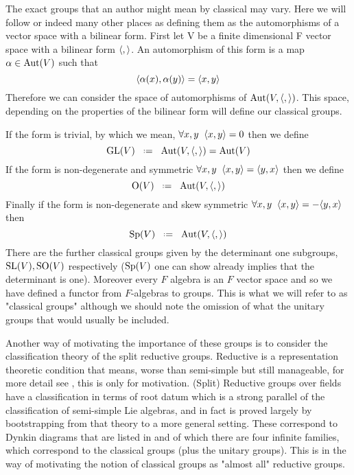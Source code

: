 The exact groups that an author might mean by classical may vary. Here we will follow \cite[\S 13]{CliffordAlgebrasClassical} or indeed many other places as defining them as the automorphisms of a vector space with a bilinear form. First let V be a finite dimensional F vector space with a bilinear form \(\langle ,\rangle\). An automorphism of this form is a map \(\alpha\in \operatorname{Aut}(V)\) such that 
\[\langle \alpha(x), \alpha(y)\rangle = \langle x,y\rangle\]
Therefore we can consider the space of automorphisms of \(\operatorname{Aut}(V, \langle ,\rangle)\). This space, depending on the properties of the bilinear form will define our classical groups. 

If the form is trivial, by which we mean, \(\forall x,y \;\; \langle x, y\rangle = 0\) then we define 
\[\GL(V) \defeq \Aut(V, \inner{,}) = \Aut(V)\]
If the form is non-degenerate and symmetric \(\forall x,y \;\; \langle x, y\rangle = \langle y,x\rangle\) then we define
\[\mathrm{O}(V) \defeq \Aut(V, \inner{,})\]
Finally if the form is non-degenerate and skew symmetric \(\forall x,y \;\; \langle x, y\rangle = -\langle y,x\rangle\) then 
\[\Sp(V) \defeq \Aut(V, \inner{,})\]
There are the further classical groups given by the determinant one subgroups, \(\operatorname{SL}(V), \mathrm{SO}(V)\) respectively (\(\operatorname{Sp}(V)\) one can show already implies that the determinant is one). Moreover every \(F\) algebra is an \(F\) vector space and so we have defined a functor from \(F\)-algebras to groups. This is what we will refer to as "classical groups" although we should note the omission of what the unitary groups that  would usually be included.

Another way of motivating the importance of these groups is to consider the classification theory of the split reductive groups. Reductive is a representation theoretic condition that means, worse than semi-simple but still manageable, for more detail see \cite[22.138]{milneAlgebraicGroupsTheory2017}, this is only for motivation. (Split) Reductive groups over fields have a classification in terms of root datum \cite[22.48]{milneAlgebraicGroupsTheory2017} which is a strong parallel of the classification of semi-simple Lie algebras, and in fact is proved largely by bootstrapping from that theory to a more general setting. These correspond to Dynkin diagrams that are listed in \cite[Appendix A,B]{shahidiEisensteinSeriesAutomorphic2010} and of which there are four infinite families, which correspond to the classical groups (plus the unitary groups). This is in the way of motivating the notion of classical groups as "almost all" reductive groups.


